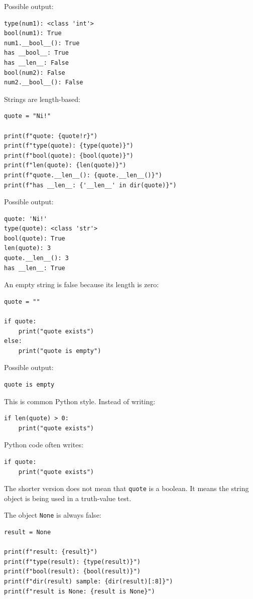 \documentclass[a4paper,twoside]{report}
\begin{document}
Possible output:

\begin{verbatim}
type(num1): <class 'int'>
bool(num1): True
num1.__bool__(): True
has __bool__: True
has __len__: False
bool(num2): False
num2.__bool__(): False
\end{verbatim}

Strings are length-based:

\begin{verbatim}
quote = "Ni!"

print(f"quote: {quote!r}")
print(f"type(quote): {type(quote)}")
print(f"bool(quote): {bool(quote)}")
print(f"len(quote): {len(quote)}")
print(f"quote.__len__(): {quote.__len__()}")
print(f"has __len__: {'__len__' in dir(quote)}")
\end{verbatim}

Possible output:

\begin{verbatim}
quote: 'Ni!'
type(quote): <class 'str'>
bool(quote): True
len(quote): 3
quote.__len__(): 3
has __len__: True
\end{verbatim}

An empty string is false because its length is zero:

\begin{verbatim}
quote = ""

if quote:
    print("quote exists")
else:
    print("quote is empty")
\end{verbatim}

Possible output:

\begin{verbatim}
quote is empty
\end{verbatim}

This is common Python style. Instead of writing:

\begin{verbatim}
if len(quote) > 0:
    print("quote exists")
\end{verbatim}

Python code often writes:

\begin{verbatim}
if quote:
    print("quote exists")
\end{verbatim}

The shorter version does not mean that \texttt{quote} is a boolean. It means the string object is being used in a truth-value test.

The object \texttt{None} is always false:

\begin{verbatim}
result = None

print(f"result: {result}")
print(f"type(result): {type(result)}")
print(f"bool(result): {bool(result)}")
print(f"dir(result) sample: {dir(result)[:8]}")
print(f"result is None: {result is None}")
\end{verbatim}
\end{document}
